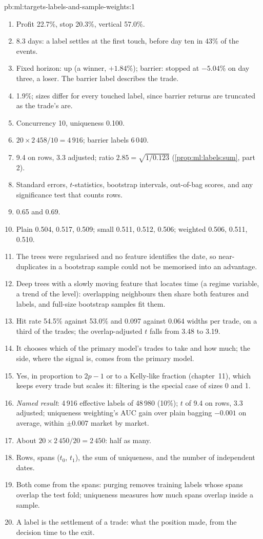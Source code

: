 \begin{solution}{pb:ml:targets-labels-and-sample-weights:1}
\begin{enumerate}
\item Profit 22.7\%, stop 20.3\%, vertical 57.0\%.
\item 8.3 days: a label settles at the first touch, before day ten in 43\% of the events.
\item Fixed horizon: up (a winner, $+1.84\%$); barrier: stopped at $-5.04\%$ on day three, a loser. The barrier label
describes the trade.
\item 1.9\%; sizes differ for every touched label, since barrier returns are truncated as the trade's are.
\item Concurrency 10, uniqueness 0.100.
\item $20\times2\,458/10 = 4\,916$; barrier labels 6\,040.
\item 9.4 on rows, 3.3 adjusted; ratio $2.85 = \sqrt{1/0.123}$ (\cref{prop:ml:labels:sum}, part 2).
\item Standard errors, $t$-statistics, bootstrap intervals, out-of-bag scores, and any significance test that counts
rows.
\item 0.65 and 0.69.
\item Plain 0.504, 0.517, 0.509; small 0.511, 0.512, 0.506; weighted 0.506, 0.511, 0.510.
\item The trees were regularised and no feature identifies the date, so near-duplicates in a bootstrap sample could not
be memorised into an advantage.
\item Deep trees with a slowly moving feature that locates time (a regime variable, a trend of the level): overlapping
neighbours then share both features and labels, and full-size bootstrap samples fit them.
\item Hit rate 54.5\% against 53.0\% and 0.097 against 0.064 widths per trade, on a third of the trades; the
overlap-adjusted $t$ falls from 3.48 to 3.19.
\item It chooses which of the primary model's trades to take and how much; the side, where the signal is, comes from
the primary model.
\item Yes, in proportion to $2p - 1$ or to a Kelly-like fraction (chapter~11), which keeps every trade but scales it:
filtering is the special case of sizes 0 and 1.
\item \emph{Named result}: 4\,916 effective labels of 48\,980 (10\%); $t$ of 9.4 on rows, 3.3 adjusted; uniqueness
weighting's AUC gain over plain bagging $-0.001$ on average, within $\pm0.007$ market by market.
\item About $20\times2\,450/20 = 2\,450$: half as many.
\item Rows, spans ($t_0$, $t_1$), the sum of uniqueness, and the number of independent dates.
\item Both come from the spans: purging removes training labels whose spans overlap the test fold; uniqueness measures
how much spans overlap inside a sample.
\item A label is the settlement of a trade: what the position made, from the decision time to the exit.
\end{enumerate}
\end{solution}

